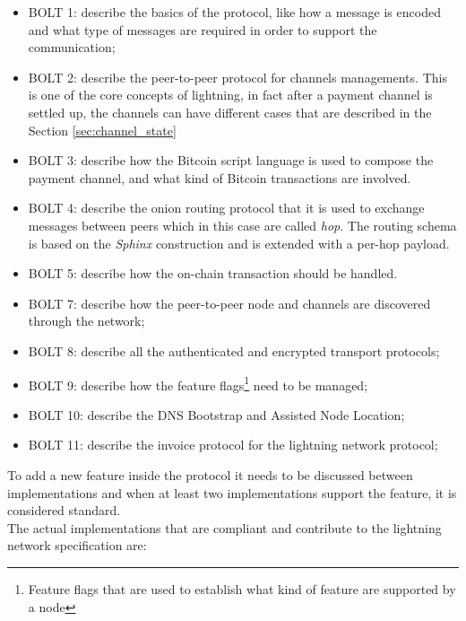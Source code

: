 \begin{itemize}
  \item BOLT 1: describe the basics of the protocol, like how a message is encoded and what type of messages are required in order to support the communication;
  \item BOLT 2: describe the peer-to-peer protocol for channels managements. This is one of the core concepts of lightning, in fact after a payment channel
        is settled up, the channels can have different cases that are described in the Section \ref{sec:channel_state}
  \item BOLT 3: describe how the Bitcoin script language is used to compose the
        payment channel, and what kind of Bitcoin transactions are involved.
  \item BOLT 4: describe the onion routing protocol that it is used to exchange messages between peers which in this case are called \emph{hop}.
        The routing schema is based on the \emph{Sphinx}\cite{sphinx} construction and is extended with a per-hop payload.
  \item BOLT 5: describe how the on-chain transaction should be handled.
  \item BOLT 7: describe how the peer-to-peer node and channels are discovered through the network;
  \item BOLT 8: describe all the authenticated and encrypted transport protocols;
  \item BOLT 9: describe how the feature flags\footnote{Feature flags that are used to establish what kind of feature are supported by a node} need to be managed;
  \item BOLT 10: describe the DNS Bootstrap and Assisted Node Location;
  \item BOLT 11: describe the invoice protocol for the lightning network protocol;
\end{itemize}

To add a new feature inside the protocol it needs to be discussed between implementations and when at least two implementations support the feature, it is considered standard.\\
The actual implementations that are compliant and contribute to the lightning network specification are:


